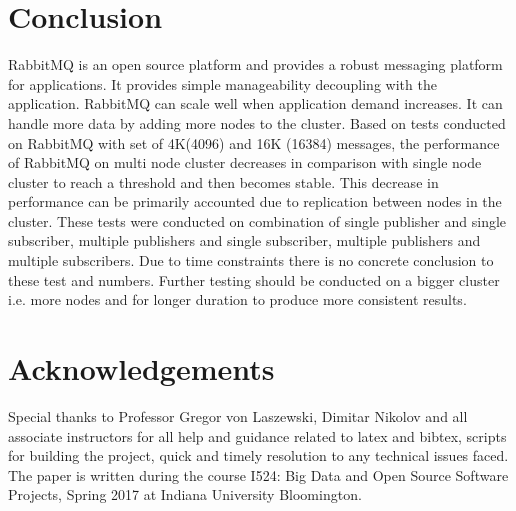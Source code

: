 \documentclass[9pt,twocolumn,twoside]{../../styles/osajnl}
\begin{document}
\section{Conclusion}
RabbitMQ is an open source platform and provides a robust messaging platform for
applications. It provides simple manageability decoupling with the application.
RabbitMQ can scale well when application demand increases. It can handle more
data by adding more nodes to the cluster. Based on tests
\cite{jones2011rabbitmq} conducted on RabbitMQ with set of 4K(4096) and 16K
(16384) messages, the performance of RabbitMQ on multi node cluster decreases in
comparison with single node cluster to reach a threshold and then becomes
stable. This decrease in performance can be primarily accounted due to
replication between nodes in the cluster. These tests were conducted on
combination of single publisher and single subscriber, multiple publishers and
single subscriber, multiple publishers and multiple subscribers. Due to time
constraints there is no concrete conclusion to these test and numbers. Further
testing should be conducted on a bigger cluster i.e. more nodes and for longer
duration to produce more consistent results.

\section*{Acknowledgements}
Special thanks to Professor Gregor von Laszewski, Dimitar Nikolov and all
associate instructors for all help and guidance related to latex and bibtex,
scripts for building the project, quick and timely resolution to any technical
issues faced. The paper is written during the course  {I524: Big Data and Open
Source Software Projects, Spring 2017} at Indiana University Bloomington.

\medskip

% 

\end{document}
